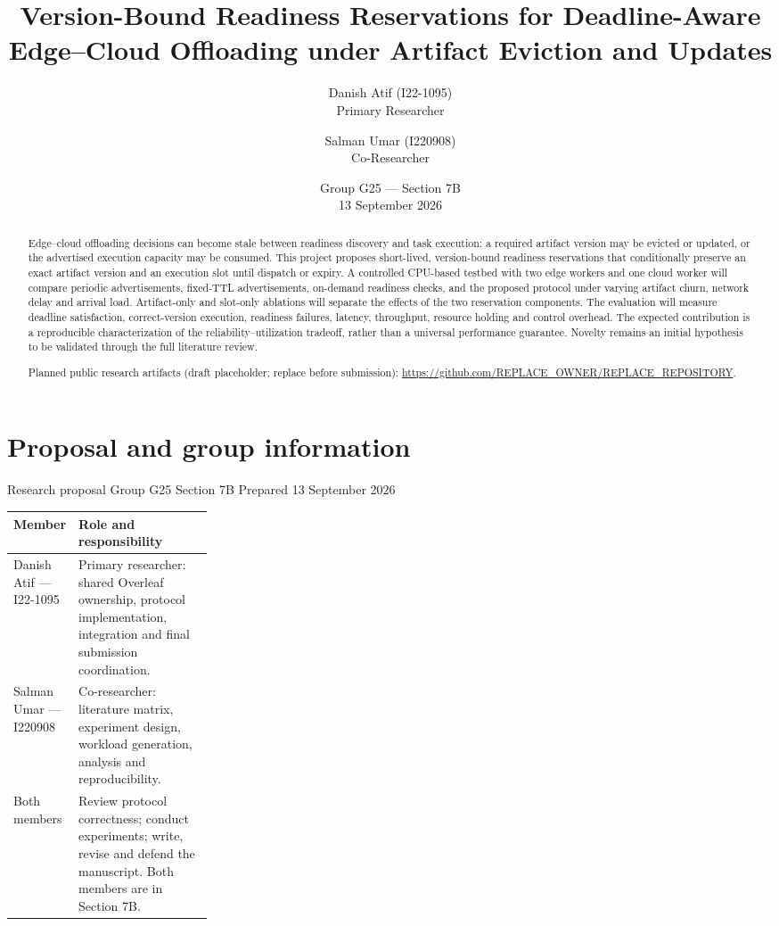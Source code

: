 \documentclass[11pt,a4paper]{article}
\title{Version-Bound Readiness Reservations for Deadline-Aware Edge--Cloud Offloading under Artifact Eviction and Updates}
\author{Danish Atif (I22-1095)\\Primary Researcher
\and Salman Umar (I220908)\\Co-Researcher}
\date{Group G25 --- Section 7B\\13 September 2026}
\begin{document}
\maketitle

\begin{abstract}
Edge--cloud offloading decisions can become stale between readiness discovery and task execution: a required artifact version may be evicted or updated, or the advertised execution capacity may be consumed. This project proposes short-lived, version-bound readiness reservations that conditionally preserve an exact artifact version and an execution slot until dispatch or expiry. A controlled CPU-based testbed with two edge workers and one cloud worker will compare periodic advertisements, fixed-TTL advertisements, on-demand readiness checks, and the proposed protocol under varying artifact churn, network delay and arrival load. Artifact-only and slot-only ablations will separate the effects of the two reservation components. The evaluation will measure deadline satisfaction, correct-version execution, readiness failures, latency, throughput, resource holding and control overhead. The expected contribution is a reproducible characterization of the reliability--utilization tradeoff, rather than a universal performance guarantee. Novelty remains an initial hypothesis to be validated through the full literature review.

Planned public research artifacts (draft placeholder; replace before submission): \url{https://github.com/REPLACE_OWNER/REPLACE_REPOSITORY}.
\end{abstract}


\section{Proposal and group information}

Research proposal \textbullet{} Group G25 \textbullet{} Section 7B \textbullet{} Prepared 13 September 2026

\begin{center}
\small
\begin{tabularx}{\linewidth}{|p{0.26\linewidth}|X|}
\hline
\textbf{Member} & \textbf{Role and responsibility} \\ \hline
Danish Atif --- I22-1095 & Primary researcher: shared Overleaf ownership, protocol implementation, integration and final submission coordination. \\ \hline
Salman Umar --- I220908 & Co-researcher: literature matrix, experiment design, workload generation, analysis and reproducibility. \\ \hline
Both members & Review protocol correctness; conduct experiments; write, revise and defend the manuscript. Both members are in Section 7B. \\ \hline
\end{tabularx}
\end{center}
\end{document}
